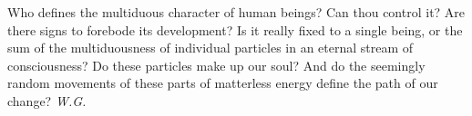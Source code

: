 Who defines the multiduous character 
of human beings? 
Can thou control it? 
Are there signs to forebode its development? 
Is it really fixed to a single being, 
or the sum of the multiduousness 
of individual particles 
in an eternal stream 
of consciousness? 
Do these particles 
make up our soul? 
And do the seemingly random movements 
of these parts of matterless energy 
define the path of our change? 
\emph{W.G.}

